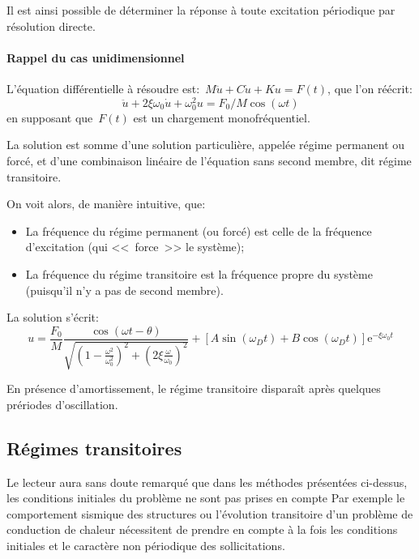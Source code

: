 Il est ainsi possible de déterminer la réponse à toute excitation périodique par résolution directe.

\medskip
{}

\medskip
{}
\paragraph{Rappel du cas unidimensionnel}
L'équation différentielle à résoudre est:~$M\ddot{u}+C\dot{u}+Ku=F(t)$, que l'on
réécrit: \begin{equation} \ddot{u}+2\xi\omega_0\dot{u}+\omega^2_0 u=F_0/M \cos(\omega t)\end{equation}
en supposant que~$F(t)$ est un chargement monofréquentiel.

La solution est somme d'une solution particulière, appelée régime permanent ou forcé, et d'une
combinaison linéaire de l'équation sans second membre, dit régime transitoire.

On voit alors, de manière intuitive, que:
\begin{itemize}%
  \item La fréquence du régime permanent (ou forcé) est celle de la fréquence d'excitation (qui <<~force~>> le système);
  \item La fréquence du régime transitoire est la fréquence propre du système (puisqu'il n'y a pas de second membre).
\end{itemize}
La solution s'écrit:
\begin{equation}
u = \dfrac{F_0}M\dfrac{\cos(\omega t-\theta)}{\sqrt{\left(1-\frac{\omega^2}{\omega_0^2}\right)^2+\left(2\xi\frac{\omega}{\omega_0}\right)^2}}
+\left[A\sin (\omega_D t)+B\cos(\omega_D t)\right] \mathrm{e}^{-\xi\omega_0 t}
\end{equation}

\medskip
En présence d'amortissement, le régime transitoire disparaît après quelques prériodes d'oscillation.






\medskip{}
\subsection{Régimes transitoires}\label{Sec-RT}
Le lecteur aura sans doute remarqué que dans les méthodes présentées ci-dessus,
les conditions initiales du problème ne sont pas prises en compte
Par exemple le comportement sismique des structures ou l'évolution transitoire d'un problème
de conduction de chaleur nécessitent de prendre en compte à la fois les conditions
initiales et le caractère non périodique des sollicitations.

